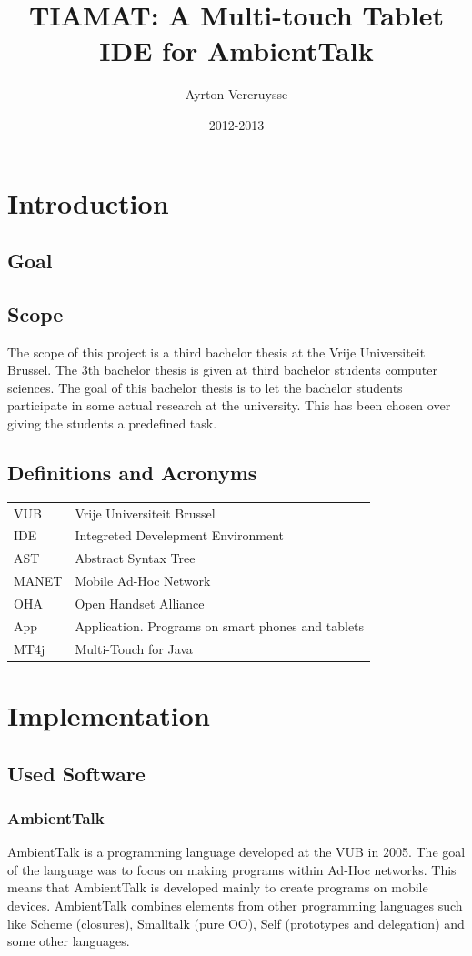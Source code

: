 \documentclass[a4paper,12pt]{report}
\author{Ayrton Vercruysse}
\title{TIAMAT: A Multi-touch Tablet IDE for AmbientTalk}
\date{2012-2013}
\begin{document}
\maketitlepage
\tableofcontents
\chapter{Introduction}
\section{Goal}



\section{Scope}
The scope of this project is a third bachelor thesis at the Vrije Universiteit Brussel. The 3th bachelor thesis is given at third bachelor students computer sciences. The goal of this bachelor thesis
is to let the bachelor students  participate in some actual research at the university. This has been chosen over giving the students a predefined task.
\section{Definitions and Acronyms}

\begin{tabular}{ l l }
  VUB & Vrije Universiteit Brussel \\
  IDE & Integreted Develepment Environment \\
  AST & Abstract Syntax Tree \\
  MANET 	& Mobile Ad-Hoc Network \\
  OHA & Open Handset Alliance \\
  App & Application. Programs on smart phones and tablets \\
  MT4j & Multi-Touch for Java \\
\end{tabular}
\chapter{Implementation}
\section{Used Software}
\subsection{AmbientTalk}
AmbientTalk is a programming language developed at the VUB in 2005. The goal of the language was to focus on making programs within Ad-Hoc networks. This means that AmbientTalk is developed mainly
to create programs on mobile devices. AmbientTalk combines elements from other programming languages such like Scheme (closures), Smalltalk (pure OO), Self (prototypes and delegation) and some
other languages.
\end{document}

